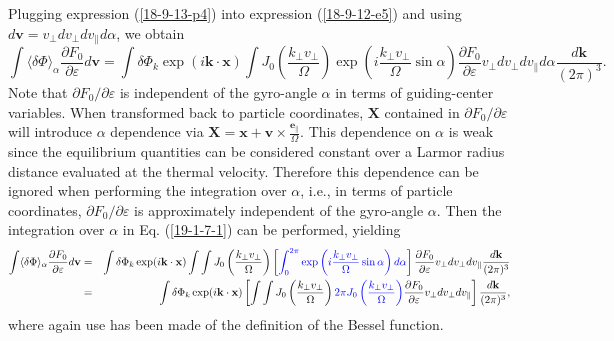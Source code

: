 \documentclass{article}
\newcommand{\tmcolor}[2]{{\color{#1}{#2}}}
\begin{document}
Plugging expression (\ref{18-9-13-p4}) into expression (\ref{18-9-12-e5}) and
using $d\mathbf{v}= v_{\perp} d v_{\perp} d v_{\parallel} d \alpha$, we obtain
\begin{equation}
  \label{19-1-7-1} \int \langle \delta \Phi \rangle_{\alpha} \frac{\partial
  F_0}{\partial \varepsilon} d\mathbf{v}= \int \delta \Phi_k \exp (i\mathbf{k}
  \cdot \mathbf{x}) \int J_0 \left( \frac{k_{\perp} v_{\perp}}{\Omega} \right)
  \exp \left( i \frac{k_{\perp} v_{\perp}}{\Omega} \sin \alpha \right)
  \frac{\partial F_0}{\partial \varepsilon} v_{\perp} d v_{\perp} d
  v_{\parallel} d \alpha \frac{d\mathbf{k}}{(2 \pi)^3} .
\end{equation}
Note that $\partial F_0 / \partial \varepsilon$ is independent of the
gyro-angle $\alpha$ in terms of guiding-center variables. When transformed
back to particle coordinates, $\mathbf{X}$ contained in $\partial F_0 /
\partial \varepsilon$ will introduce $\alpha$ dependence via
$\mathbf{X}=\mathbf{x}+\mathbf{v} \times
\frac{\mathbf{e}_{\parallel}}{\Omega}$. This dependence on $\alpha$ is weak
since the equilibrium quantities can be considered constant over a Larmor
radius distance evaluated at the thermal velocity. Therefore this dependence
can be ignored when performing the integration over $\alpha$, i.e., in terms
of particle coordinates, $\partial F_0 / \partial \varepsilon$ is
approximately independent of the gyro-angle $\alpha$. Then the integration
over $\alpha$ in Eq. (\ref{19-1-7-1}) can be performed, yielding
\begin{eqnarray}
  \int \langle \delta \Phi \rangle_{\alpha} \frac{\partial F_0}{\partial
  \varepsilon} d\mathbf{v} & = & \int \delta \Phi_k \exp (i\mathbf{k} \cdot
  \mathbf{x}) \int \int J_0 \left( \frac{k_{\perp} v_{\perp}}{\Omega} \right)
  \left[ \tmcolor{blue}{\int_0^{2 \pi} \exp \left( i \frac{k_{\perp}
  v_{\perp}}{\Omega} \sin \alpha \right) d \alpha} \right] \frac{\partial
  F_0}{\partial \varepsilon} v_{\perp} d v_{\perp} d v_{\parallel}
  \frac{d\mathbf{k}}{(2 \pi)^3} \nonumber\\
  & = & \int \delta \Phi_k \exp (i\mathbf{k} \cdot \mathbf{x}) \left[ \int
  \int J_0 \left( \frac{k_{\perp} v_{\perp}}{\Omega} \right) \tmcolor{blue}{2
  \pi J_0 \left( \frac{k_{\perp} v_{\perp}}{\Omega} \right)} \frac{\partial
  F_0}{\partial \varepsilon} v_{\perp} d v_{\perp} d v_{\parallel} \right]
  \frac{d\mathbf{k}}{(2 \pi)^3},  \label{18-9-13-a4}
\end{eqnarray}
where again use has been made of the definition of the Bessel function.
\end{document}
